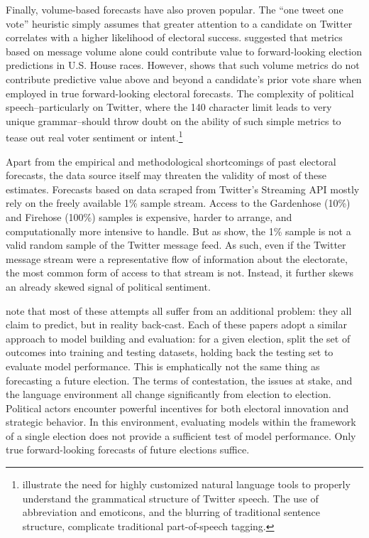 \documentclass{article}
\begin{document}
Finally, volume-based forecasts have also proven popular. The ``one
tweet one vote'' heuristic simply assumes that greater attention to a
candidate on Twitter correlates with a higher likelihood of electoral
success. \cite{digrazia2013} suggested that metrics based on message
volume alone could contribute value to forward-looking election
predictions in U.S. House races. However, \cite{huberty2013twitter}
shows that such volume metrics do not contribute predictive value above
and beyond a candidate's prior vote share when employed in true
forward-looking electoral forecasts. The complexity of political
speech--particularly on Twitter, where the 140 character limit leads
to very unique grammar--should throw doubt on the ability of such
simple metrics to tease out real voter sentiment or
intent.\footnote{\cite{owoputi2013improved} illustrate the need for
  highly customized natural language tools to properly understand the
  grammatical structure of Twitter speech. The use of abbreviation and
  emoticons, and the blurring of traditional sentence structure,
  complicate traditional part-of-speech tagging.}

Apart from the empirical and methodological shortcomings of past
electoral forecasts, the data source itself may threaten the validity
of most of these estimates. Forecasts based on data scraped from
Twitter's Streaming API mostly rely on the freely available 1\% sample
stream. Access to the Gardenhose (10\%) and Firehose (100\%) samples
is expensive, harder to arrange, and computationally more intensive to
handle. But as \cite{morstatter2013sample} show, the 1\% sample is not
a valid random sample of the Twitter message feed. As such, even if
the Twitter message stream were a representative flow of information
about the electorate, the most common form of access to that stream is
not. Instead, it further skews an already skewed signal of political
sentiment.

\cite{metaxas2011not} note that most of these attempts all suffer from
an additional problem: they all claim to predict, but in reality
back-cast. Each of these papers adopt a similar approach to model
building and evaluation: for a given election, split the set of
outcomes into training and testing datasets, holding back the testing
set to evaluate model performance. This is emphatically not the same
thing as forecasting a future election. The terms of contestation, the
issues at stake, and the language environment all change significantly
from election to election. Political actors encounter powerful
incentives for both electoral innovation and strategic behavior. In
this environment, evaluating models within the framework of a single
election does not provide a sufficient test of model performance. Only
true forward-looking forecasts of future elections suffice.
\end{document}
